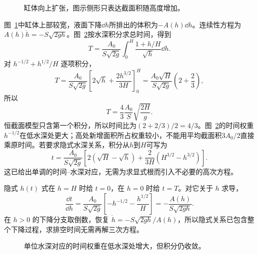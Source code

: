 \begin{figure}[H]\centering
{}
\caption{缸体向上扩张，图示侧形只表达截面积随高度增加。}\label{fig:c2-h1-q}
\end{figure}
\begin{solution}
图~\ref{fig:c2-h1-q}中缸体上部较宽，液面下降$\dd h$所排出的体积为$-A(h)\dd h$。连续性方程为$A(h)\dot h=-S\sqrt{2gh}$。图~\ref{fig:c2-h1-s}按水深积分求总时间，得到
\[T=\frac{A_0}{S\sqrt{2g}}\int_0^H\frac{1+h/H}{\sqrt h}\dd h.
\]
对 $h^{-1/2}+h^{1/2}/H$ 逐项积分，
\[
T=\frac{A_0}{S\sqrt{2g}}\left[2\sqrt h+\frac{2h^{3/2}}{3H}\right]_0^H
=\frac{A_0\sqrt H}{S\sqrt{2g}}\left(2+\frac23\right),
\]
所以
\[\boxed{T=\frac43\frac{A_0}{S}\sqrt{\frac{2H}g}}.
\]
恒截面模型只含第一个积分，所以时间比为$(2+2/3)/2=4/3$。图~\ref{fig:c2-h1-s}的时间权重$h^{-1/2}$在低水深处更大；高处新增面积所占权重较小，不能用平均截面积$3A_0/2$直接乘原时间。若要求隐式水深关系，积分从$h$到$H$可写为
\[t=\frac{A_0}{S\sqrt{2g}}\left[2(\sqrt H-\sqrt h)+\frac{2}{3H}(H^{3/2}-h^{3/2})\right].
\]
这已给出单调的时间--水深对应，无需为求显式根而引入不必要的高次方程。


隐式 $h(t)$ 式在 $h=H$ 时给 $t=0$，在 $h=0$ 时给 $t=T$。对它关于 $h$ 求导，
\[
\frac{\dd t}{\dd h}=\frac{A_0}{S\sqrt{2g}}\left[-h^{-1/2}-\frac{h^{1/2}}H\right]
=-\frac{A(h)}{S\sqrt{2gh}}.
\]
在 $h>0$ 的下降分支取倒数，恢复 $\dot h=-S\sqrt{2gh}/A(h)$，所以隐式关系已包含整个下降过程，求排空时间无需再解三次方程。

\begin{figure}[H]\centering
{}
\caption{单位水深对应的时间权重在低水深处增大，但积分仍收敛。}\label{fig:c2-h1-s}
\end{figure}
\end{solution}

